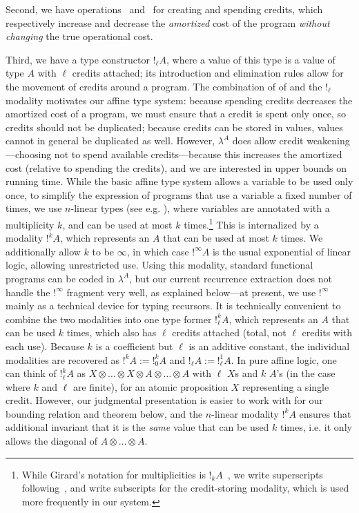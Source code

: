 Second, we have operations \waitname\ and \discname\ for creating and spending
credits, which respectively increase and decrease the
\emph{amortized} cost of the program \textit{without changing} the true
operational cost.

Third, we have a type constructor $!_\ell A$, where a value of this type
is a value of type $A$ with $\ell$ credits attached; its introduction
and elimination rules allow for the movement of credits around a
program.  The combination of of \discname\/ and the $!_\ell$ modality
motivates our affine type system: because spending credits decreases the
amortized cost of a program, we must ensure that a credit is spent only
once, so credits should not be duplicated; because credits can be stored
in values, values cannot in general be duplicated as well.  However,
$\lambda^A$ does allow credit weakening---choosing not to spend
available credits---because this increases the amortized cost (relative
to spending the credits), and we are interested in upper bounds on
running time.  While the basic affine type system allows a variable to
be used only once, to simplify the expression of programs that use a
variable a fixed number of times, we use $n$-linear types (see e.g.
\cite{girard-et-al:tcs92:bll,reed:names-useless,mcbride:plenty-o-nuttin,atkey:lics18}),
where variables are annotated with a multiplicity $k$, and can be used
at most $k$ times.\footnote{While Girard's notation for multiplicities
  is $!_k A$~\cite{girard-et-al:tcs92:bll}, we write superscripts
  following~\citet{atkey:lics18}, and write subscripts for the
  credit-storing modality, which is used more frequently in our system.}
This is internalized by a modality $!^k A$, which represents an $A$ that
can be used at most $k$ times.  We additionally allow $k$ to be
$\infty$, in which case $!^\infty A$ is the usual exponential of linear
logic, allowing unrestricted use.  Using this modality, standard
functional programs can be coded in $\lambda^A$, but our current
recurrence extraction does not handle the $!^\infty$ fragment very well,
as explained below---at present, we use $!^\infty$ mainly as a technical
device for typing recursors.  It is technically convenient to combine
the two modalities into one type former $!^k_\ell A$, which represents
an $A$ that can be used $k$ times, which also has $\ell$ credits
attached (total, not $\ell$ credits with each use).  Because $k$ is a
coefficient but $\ell$ is an additive constant, the individual
modalities are recovered as $!^k A := !^k_0 A$ and $!_\ell A := !^1_\ell
A$.  In pure affine logic, one can think of $!^k_\ell A$ as $X \otimes
\ldots \otimes X \otimes A \otimes \ldots \otimes A$ with $\ell$ $X$s
and $k$ $A$'s (in the case where $k$ and $\ell$ are finite), for an
atomic proposition $X$ representing a single credit.  However, our
judgmental presentation is easier to work with for our bounding relation
and theorem below, and the $n$-linear modality $!^k A$ ensures that
additional invariant that it is the \emph{same} value that can be used
$k$ times, i.e. it only allows the diagonal of $A \otimes \ldots \otimes
A$.

